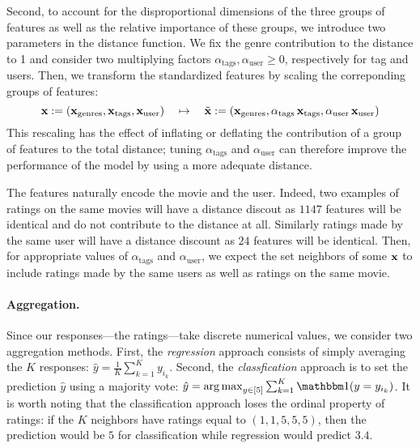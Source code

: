 \documentclass[bj, preprint]{imsart}
\begin{document}
Second, to account for the disproportional dimensions of the three groups of features as well as the relative importance of these groups, we introduce two parameters in the distance function. We fix the genre contribution to the distance to 1 and consider two multiplying factors $\alpha_\text{tags}, \alpha_\text{user}\geqslant 0$, respectively for tag and users. Then, we transform the standardized features by scaling the correponding groups of features:
\begin{equation*}
	\bx:=(\bx_\text{genres}, \bx_\text{tags}, \bx_\text{user})
	\quad\mapsto\quad
	\tilde{\bx}:=(\bx_\text{genres}, \alpha_\text{tags}\bx_\text{tags}, \alpha_\text{user}\bx_\text{user})
\end{equation*}
This rescaling has the effect of inflating or deflating the contribution of a group of features to the total distance; tuning $\alpha_\text{tags}$ and $\alpha_\text{user}$ can therefore improve the performance of the model by using a more adequate distance.

The features naturally encode the movie and the user. Indeed, two examples of ratings on the same movies will have a distance discout as $1147$ features will be identical and do not contribute to the distance at all. Similarly ratings made by the same user will have a distance discount as $24$ features will be identical. Then, for appropriate values of $\alpha_\text{tags}$ and $\alpha_\text{user}$, we expect the set neighbors of some $\operatorname{\mathbf x}$ to include ratings made by the same users as well as ratings on the same movie.

\paragraph{Aggregation.}\label{par:method.models.knn.agg}

Since our responses---the ratings---take discrete numerical values, we consider two aggregation methods. First, the \textit{regression} approach consists of simply averaging the $K$ responses: $\hat{y} = \frac 1K \sum_{k=1}^{K} y_{i_k}$. Second, the \textit{classfication} approach is to set the prediction $\hat{y}$ using a majority vote: $\hat{y} = \argmax_{y\in[5]}\sum_{k=1}^{K} \ind(y=y_{i_k})$. It is worth noting that the classification approach loses the ordinal property of ratings: if the $K$ neighbors have ratings equal to $(1,1,5,5,5)$, then the prediction would be $5$ for classification while regression would predict $3.4$.
\end{document}
